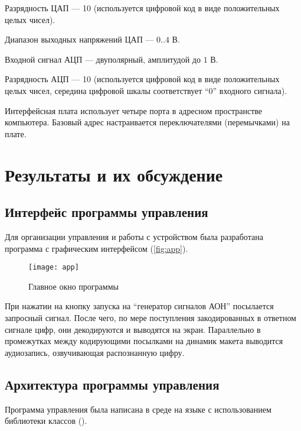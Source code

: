 Разрядность ЦАП --- 10 (используется цифровой код в виде положительных целых чисел).

Диапазон выходных напряжений ЦАП --- $0..4$ В.

Входной сигнал АЦП --- двуполярный, амплитудой до $1$ В.

Разрядность АЦП --- 10 (используется цифровой код в виде положительных целых чисел, середина цифровой шкалы соответствует \enquote{0} входного сигнала).

Интерфейсная плата использует четыре порта в адресном пространстве компьютера. Базовый адрес настраивается переключателями (перемычками) на плате.

\section{Результаты и их обсуждение}

\subsection{Интерфейс программы управления}

Для организации управления и работы с устройством была разработана программа с графическим интерфейсом (\autoref{fig:app}).

\begin{figure}[h]%
\centering
\texttt{[image: app]}%
\caption[]{Главное окно программы}%
\label{fig:app}%
\end{figure}

При нажатии на кнопку запуска на \enquote{генератор сигналов АОН} посылается запросный сигнал. После чего, по мере поступления закодированных в ответном сигнале цифр, они декодируются и выводятся на экран. Параллельно в промежутках между кодирующими посылками на динамик макета выводится аудиозапись, озвучивающая распознанную цифру.

\subsection{Архитектура программы управления}

Программа управления была написана в среде  на языке  с использованием библиотеки классов  ().

